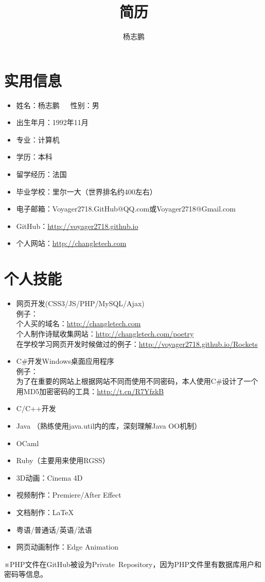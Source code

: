 \documentclass[UTF8]{ctexart}
\title{简历}
\author{杨志鹏}
\begin{document}
\maketitle
\pagestyle{fancy}
\tableofcontents{}
\newpage
\section{实用信息}
\begin{itemize}
\item 姓名：杨志鹏\ \ \ 性别：男
\item 出生年月：1992年11月
\item 专业：计算机
\item 学历：本科
\item 留学经历：法国
\item 毕业学校：里尔一大（世界排名约400左右）
\item 电子邮箱：Voyager2718.GitHub@QQ.com或Voyager2718@Gmail.com
\item GitHub：\url{http://voyager2718.github.io}
\item 个人网站：\url{http://changletech.com}
\end{itemize}
\section{个人技能}
\begin{itemize}
\item 网页开发(CSS3/JS/PHP/MySQL/Ajax)\\
例子：\\
个人买的域名：\url{http://changletech.com}\\
个人制作诗赋收集网站：\url{http://changletech.com/poetry}\\
在学校学习网页开发时候做过的例子：\url{http://voyager2718.github.io/Rockets}
\item C\#{}开发Windows桌面应用程序\\
例子：\\
为了在重要的网站上根据网站不同而使用不同密码，本人使用C\#{}设计了一个用MD5加密密码的工具：\url{http://t.cn/R7YfzkB}
\item C/C++开发
\item Java （熟练使用java.util内的库，深刻理解Java OO机制）
\item OCaml
\item Ruby（主要用来使用RGSS）
\item 3D动画：Cinema 4D
\item 视频制作：Premiere/After Effect
\item 文档制作：\LaTeX
\item 粤语/普通话/英语/法语
\item 网页动画制作：Edge Animation
\end{itemize}
※PHP文件在GitHub被设为Private\ Repository，因为PHP文件里有数据库用户和密码等信息。
\end{document}
